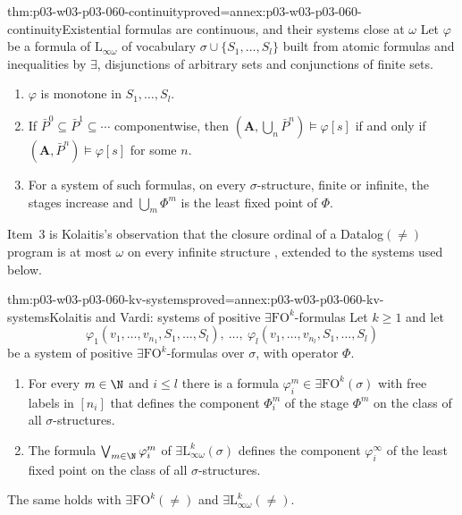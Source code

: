 \begin{hblemma}{thm:p03-w03-p03-060-continuity}{proved=annex:p03-w03-p03-060-continuity}{Existential formulas are continuous, and their systems close at \(\omega\)}
Let \(\varphi\) be a formula of \(\mathrm{L}_{\infty\omega}\) of vocabulary
\(\sigma\cup\{S_1,\ldots,S_l\}\) built from atomic formulas and
inequalities by \(\exists\), disjunctions of arbitrary sets and
conjunctions of finite sets.
\begin{enumerate}
\item \(\varphi\) is monotone in \(S_1,\ldots,S_l\).
\item If \(\bar P^0\subseteq\bar P^1\subseteq\cdots\) componentwise, then
      \((\mathbf A,\bigcup_n\bar P^n)\models\varphi[s]\) if and only if
      \((\mathbf A,\bar P^n)\models\varphi[s]\) for some \(n\).
\item For a system of such formulas, on every \(\sigma\)-structure, finite
      or infinite, the stages increase and \(\bigcup_m\Phi^m\) is the least
      fixed point of \(\Phi\).
\end{enumerate}
\end{hblemma}

Item~3 is Kolaitis's observation that the closure ordinal of a
Datalog\((\neq)\) program is at most \(\omega\) on every infinite structure
\cite[p.~46]{Kolaitis2003ExpressivePowerNotes}, extended to the
systems used below.

\begin{hbtheorem}{thm:p03-w03-p03-060-kv-systems}{proved=annex:p03-w03-p03-060-kv-systems}{Kolaitis and Vardi: systems of positive \(\exists\mathrm{FO}^k\)-formulas}
Let \(k\ge1\) and let
\[
 \varphi_1(v_1,\ldots,v_{n_1},S_1,\ldots,S_l),\ \ldots,\ \varphi_l(v_1,\ldots,v_{n_l},S_1,\ldots,S_l)
\]
be a system of positive \(\exists\mathrm{FO}^k\)-formulas over \(\sigma\),
with operator \(\Phi\).
\begin{enumerate}
\item For every \(m\in\N\) and \(i\le l\) there is a formula
      \(\varphi^m_i\in\exists\mathrm{FO}^k(\sigma)\) with free labels in
      \([n_i]\) that defines the component \(\Phi^m_i\) of the stage
      \(\Phi^m\) on the class of all \(\sigma\)-structures.
\item The formula \(\bigvee_{m\in\N}\varphi^m_i\) of
      \(\exists\mathrm{L}^k_{\infty\omega}(\sigma)\) defines the component
      \(\varphi_i^\infty\) of the least fixed point on the class of all
      \(\sigma\)-structures.
\end{enumerate}
The same holds with \(\exists\mathrm{FO}^k(\neq)\) and
\(\exists\mathrm{L}^k_{\infty\omega}(\neq)\).
\end{hbtheorem}


